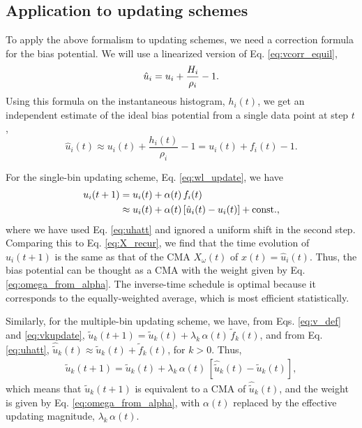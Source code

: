 \documentclass[reprint, superscriptaddress, floatfix]{revtex4-1}
\begin{document}
\subsection{\label{sec:ave_us}
Application to updating schemes}

To apply the above formalism to updating schemes,
we need a correction formula for the bias potential.
%
We will use a linearized version of Eq. \eqref{eq:vcorr_equil},
%
\begin{equation}
  \hat u_i = u_i + \frac{ H_i } { \rho_i } -1
  .
  \notag
\end{equation}
%
Using this formula on
the instantaneous histogram, $h_i(t)$,
we get an independent estimate of the ideal bias potential
from a single data point at step $t$,
%
\begin{equation}
  \hat u_i(t)
  \approx u_i(t) + \frac{ h_i(t) } { \rho_i } - 1
  = u_i(t) + f_i(t) - 1
  .
  \label{eq:uhatt}
\end{equation}

For the single-bin updating scheme, Eq. \eqref{eq:wl_update},
we have
\begin{align}
  u_i(t+1)
  &=
  u_i(t) + \alpha(t) \, f_i(t)
  \notag \\
  &\approx
  u_i(t) + \alpha(t) \, [\hat u_i(t) - u_i(t)] + \mathrm{const.}
  ,
  \notag
\end{align}
where we have used Eq. \eqref{eq:uhatt}
and ignored a uniform shift in the second step.
%
Comparing this to Eq. \eqref{eq:X_recur},
we find that the time evolution of $u_i(t+1)$
is the same as that of the CMA $X_\omega(t)$
of $x(t) = \hat u_i(t)$.
%
Thus, the bias potential can be thought as
a CMA with the weight given by Eq. \eqref{eq:omega_from_alpha}.
%
The inverse-time schedule is optimal
because it corresponds to the equally-weighted average,
which is most efficient statistically.

Similarly, for the multiple-bin updating scheme,
we have, from Eqs. \eqref{eq:v_def} and \eqref{eq:vkupdate},
${\tilde u}_k(t + 1) = {\tilde u}_k(t) + \lambda_k \, \alpha(t) \, {\tilde f}_k(t)$,
and from Eq. \eqref{eq:uhatt},
$\hat{\tilde u}_k(t) \approx {\tilde u}_k(t) + {\tilde f}_k(t)$,
for $k > 0$.
Thus,
\begin{align*}
  \tilde u_k(t+1) = \tilde u_k(t) + \lambda_k \, \alpha(t) \,
  \left[
    \hat{\tilde u}_k(t) - \tilde u_k(t)
  \right]
  ,
\end{align*}
%
which means that
$\tilde u_k(t+1)$ is equivalent to
a CMA of $\hat{\tilde u}_k(t)$,
and the weight is given by Eq. \eqref{eq:omega_from_alpha},
with $\alpha(t)$ replaced by the effective updating magnitude,
$\lambda_k \, \alpha(t)$.
\end{document}
